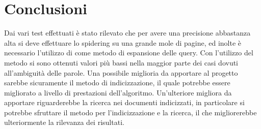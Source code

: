 \chapter{Conclusioni}
Dai vari test effettuati è stato rilevato che per avere una precisione abbastanza alta si deve effettuare lo spidering su una grande mole di pagine, ed inolte è necessario l'utilizzo di  come metodo di espansione delle query. Con l'utilizzo del metodo  si sono ottenuti valori più bassi nella maggior parte dei casi dovuti all'ambiguità delle parole. Una possibile miglioria da apportare al progetto sarebbe sicuramente il metodo di indicizzazione, il quale potrebbe essere migliorato a livello di prestazioni dell'algoritmo. Un'ulteriore migliora da apportare riguarderebbe la ricerca nei documenti indicizzati, in particolare si potrebbe sfruttare il metodo  per l'indicizzazione e la ricerca, il che migliorerebbe ulteriormente la rilevanza dei risultati.